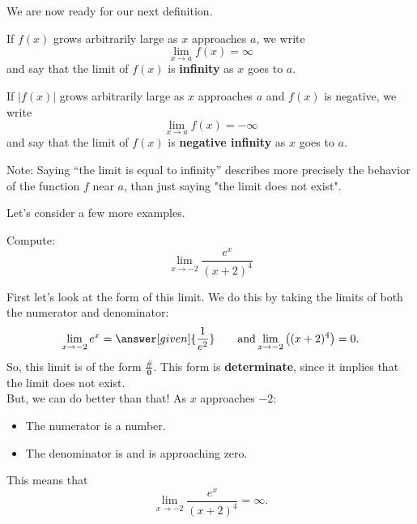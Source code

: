 \documentclass{ximera}
\begin{document}
We are now ready for our next definition.

\begin{definition}
If $f(x)$ grows arbitrarily large as $x$ approaches $a$, we write
\[
\lim_{x\to a} f(x) = \infty
\]
and say that the limit of $f(x)$ is  \textbf{infinity} as $x$
goes to $a$.


If $|f(x)|$ grows arbitrarily large as $x$ approaches $a$ and $f(x)$ is
negative, we write
\[
\lim_{x\to a} f(x) = -\infty
\]
and say that the limit of $f(x)$ is  \textbf{ negative infinity}
as $x$ goes to $a$.

\end{definition}

Note: Saying ``the limit is equal to infinity''  describes more precisely the behavior of the function $f$ near $a$, than just saying "the limit does not exist".

Let's consider a few more examples.

\begin{example}
  Compute:
  \[
  \lim_{x\to -2} \frac{e^x}{(x+2)^4}
  \]
  \begin{explanation}
    First let's look at the form of this limit. We do this by taking the limits of both the numerator and denominator:
    \[
    \lim_{x\to -2} e^x = \answer[given]{\frac{1}{e^2}}\qquad\text{and}\lim_{x\to-2}\left((x+2)^4\right) = 0.
    \]
    So, this limit is of the form $\boldsymbol{\tfrac{\#}{0}}$. This form is \textbf{determinate}, since it implies that  the limit does not exist.\\
    But, we can do better than that!
     As $x$ approaches $-2$:
    \begin{itemize}
    \item The numerator is a  number. 
    \item The denominator is  and is approaching zero.
    \end{itemize}
    This means that 
    \[
    \lim_{x\to -2} \frac{e^x}{(x+2)^4} = \infty.
    \]
  
  \end{explanation}
\end{example}
\end{document}
